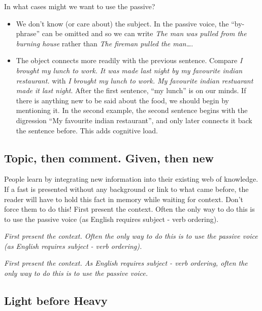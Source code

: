 \documentclass{article}
\newcommand{\example}[1]{\textit{#1}}
\begin{document}
In what cases might we want to use the passive?
\begin{itemize}
    \item We don't know (or care about) the subject. In the passive voice, the ``by-phrase'' can be omitted and so we can write \example{The man was pulled from the burning house} rather than \example{The fireman pulled the man\ldots}.
    \item The object connects more readily with the previous sentence. Compare \example{I brought my lunch to work. It was made last night by my favourite indian restaurant.} with \example{I brought my lunch to work. My favourite indian restuarant made it last night}. After the first sentence, ``my lunch'' is on our minds. If there is anything new to be said about the food, we should begin by mentioning it. In the second example, the second sentence begins with the digression ``My favourite indian restaurant'', and only later connects it back the sentence before. This adds cognitive load.
\end{itemize}

\subsection{Topic, then comment. Given, then new}

People learn by integrating new information into their existing web of knowledge. If a fast is presented without any background or link to what came before, the reader will have to hold this fact in memory while waiting for context. Don't force them to do this! First present the context. Often the only way to do this is to use the passive voice (as English requires subject - verb ordering).

\example{First present the context. Often the only way to do this is to use the passive voice (as English requires subject - verb ordering).}

\example{First present the context. As English requires subject - verb ordering, often the only way to do this is to use the passive voice.}

\subsection{Light before Heavy}
\end{document}
